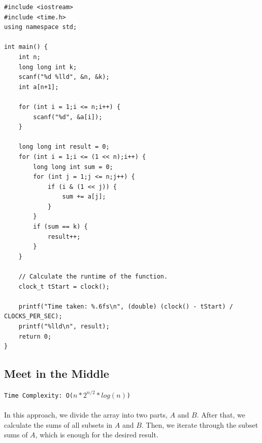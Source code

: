 \documentclass[12pt]{article}
\begin{document}
\begin{verbatim}
#include <iostream>
#include <time.h>
using namespace std;

int main() {
    int n;
    long long int k;
    scanf("%d %lld", &n, &k);
    int a[n+1];
    
    for (int i = 1;i <= n;i++) {
        scanf("%d", &a[i]);
    }
    
    long long int result = 0;
    for (int i = 1;i <= (1 << n);i++) {
        long long int sum = 0;
        for (int j = 1;j <= n;j++) {
            if (i & (1 << j)) {
                sum += a[j];
            }
        }
        if (sum == k) {
            result++;
        }
    }
    
    // Calculate the runtime of the function.
    clock_t tStart = clock();

    printf("Time taken: %.6fs\n", (double) (clock() - tStart) / CLOCKS_PER_SEC);
    printf("%lld\n", result);
    return 0;
}
\end{verbatim}
\clearpage


\subsection{Meet in the Middle }
\texttt{Time Complexity: O($n*2^{n/2}*log(n)$) } \\ \\
In this approach, we divide the array into two parts, $A$ and $B$. After that, we calculate the sums of all subsets in $A$ and $B$. Then, we iterate through the subset sums of $A$, which is enough for the desired result.
\end{document}
